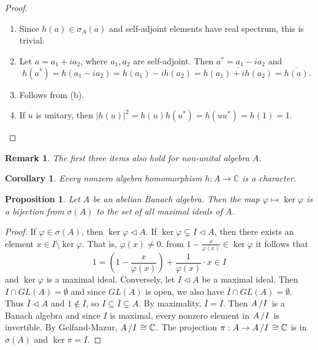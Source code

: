 \documentclass[10pt, a4paper]{article}
\newtheorem{corollary}[thm]{Corollary}
\newtheorem{proposition}[thm]{Proposition}
\newtheorem*{remark}{Remark}
\newenvironment{noticeC}{%
  \tcolorbox[%
  notitle,
  empty,
  enhanced,  %
  breakable,
  coltext=black, 
  fontupper=\rmfamily,
  noparskip,
  sharp corners,
  boxrule=-1pt,  %
  frame hidden,
  left=7pt,  %
  right=7pt,
  top=5pt,
  bottom=5pt,
  before skip=2.5ex plus 2pt,
  after skip=2.5ex plus 2pt,
  overlay unbroken and last={%
  },
  ]}
{\endtcolorbox}
\newenvironment{myproof}%
  {\begin{noticeC}\begin{proof}}%
  {\end{proof}\end{noticeC}}
\newcommand{\C}{\mathbb {C}}
\newcommand{\quot}[2]{{\raisebox{0em}{$#1$}\left/\raisebox{0em}{$#2$}\right.}}
\begin{document}
\begin{myproof}
  \begin{enumerate}
    \item Since $h(a) \in \sigma_A(a)$ and self-adjoint elements have real spectrum, this is trivial.
    \item Let $a = a_1 + i a_2$, where $a_1, a_2$ are self-adjoint. Then $a^* = a_1 - i a_2$ and 
    $$h(a^*) = h(a_1 - i a_2) = h(a_1) - i h(a_2) = \overline{h(a_1) + i h(a_2)} = \overline{h(a)}.$$
    \item Follows from (b).
    \item If $u$ is unitary, then $|h(u)|^2 = h(u) h(u^*) = h(u u^*) = h(1) = 1$. \qedhere
  \end{enumerate}
\end{myproof}

\begin{remark}
  The first three items also hold for non-unital algebra $A$.
\end{remark}

\begin{corollary}
  Every nonzero algebra homomorphism $h: A \to \C$ is a character.
\end{corollary}

\begin{proposition}
  Let $A$ be an abelian Banach algebra. Then the map $\varphi \mapsto \ker \varphi$
  is a bijection from $\sigma (A)$ to the set of all maximal ideals of $A$.
\end{proposition}

\begin{myproof}
  If $\varphi \in \sigma (A)$, then $\ker \varphi \lhd A$. If $\ker \varphi \subsetneq I \lhd A$, then there exists
  an element $x \in I \setminus \ker \varphi$. That is, $\varphi(x) \neq 0$.
  from $1 - \frac{x}{\varphi(x)} \in \ker \varphi$ it follows that 
  $$1 = \left(1 - \frac{x}{\varphi(x)}\right) + \frac{1}{\varphi(x)} \cdot x \in I$$
  and $\ker \varphi$ is a maximal ideal.
  Conversely, let $I \lhd A$ be a maximal ideal. Then $I \cap GL(A) = \emptyset$
  and since $GL(A)$ is open, we also have $\overline{I} \cap GL(A) = \emptyset$.
  Thus $\overline{I} \lhd A$ and $1 \notin \overline{I}$, so $I \subseteq \overline{I} \subsetneq A$.
  By maximality, $\overline{I} = I$. Then $\quot{A}{I}$ is a Banach algebra and since $I$ is maximal,
  every nonzero element in $\quot{A}{I}$ is invertible. By Gelfand-Mazur, $\quot{A}{I} \cong \C$.
  The projection $\pi: A \to \quot{A}{I} \cong \C$ is in $\sigma (A)$ and $\ker \pi = I$.
\end{myproof}
\end{document}
